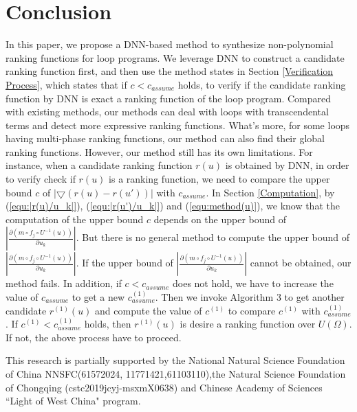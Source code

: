 \section{Conclusion}
\label{Conclusion}
In this paper, we propose a DNN-based method to synthesize non-polynomial ranking functions for loop programs. We leverage DNN to construct a candidate ranking function first, and then use the method states in Section \ref{Verification Process}, which states that if $c<c_{assume}$ holds, to verify if the candidate ranking function by DNN is exact a ranking function of the loop program. Compared with existing methods, our methods can deal with loops with transcendental terms and detect more expressive ranking functions. What's more, for some loops having multi-phase ranking functions, our method can also find their global ranking functions. However, our method still has its own limitations. For instance, when a candidate ranking function $r(u)$ is obtained by DNN, in order to verify check if $r(u)$ is a ranking function, we need to compare the upper bound $c$ of $\left| {\bigtriangledown (r(u) - r(u'))} \right|$ with $c_{assume}$. In Section \ref{Computation}, by (\ref{equ:|r(u)/u_k|}), (\ref{equ:|r(u')/u_k|}) and (\ref{equ:method(u)}), we know that the computation of the upper bound $c$  depends on the upper bound of ${\left| {\frac{{\partial (m \circ {f_j} \circ {U^{ - 1}}(u))}}{{\partial {u_k}}}} \right|}$. But there is no general method to compute the upper bound of ${\left| {\frac{{\partial (m \circ {f_j} \circ {U^{ - 1}}(u))}}{{\partial {u_k}}}} \right|}$. If the upper bound of ${\left| {\frac{{\partial (m \circ {f_j} \circ {U^{ - 1}}(u))}}{{\partial {u_k}}}} \right|}$ cannot be obtained, our method fails. In addition, if $c<c_{assume}$ does not hold, we have to increase the value of $c_{assume}$ to get a new $c^{(1)}_{assume}$. Then we invoke Algorithm 3 to get another candidate $r^{(1)}(u)$ and compute the value of $c^{(1)}$ to compare $c^{(1)}$ with $c^{(1)}_{assume}$. If $c^{(1)}<c^{(1)}_{assume}$ holds, then $r^{(1)}(u)$ is desire a ranking function over $U(\Omega)$. If not, the above process have to proceed.


\begin{acknowledgements}
This research is partially supported by the National Natural Science Foundation of China NNSFC(61572024,
11771421,61103110),the Natural Science Foundation of Chongqing (cstc2019jcyj-msxmX0638) and Chinese Academy of Sciences ``Light of West China" program.
\end{acknowledgements}


